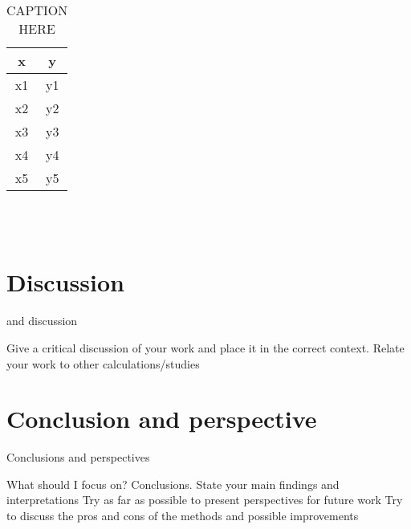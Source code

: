 \documentclass{article}
\begin{document}
    \begin{table}[H]
      \centering
      \caption{CAPTION HERE}
      \vspace{2mm}
      \label{tab:LABELHERE}
      \begin{tabular}{|c|c|}
          \hline
           x & y\\
          \hline \hline
          x1 & y1 \\
          x2 & y2 \\
          x3 & y3 \\
          x4 & y4 \\
          x5 & y5 \\
          \hline
      \end{tabular} \\
      \hspace{0pt}\\
    \end{table}
\fi

\vspace{1cm}

\clearpage
\newpage

\section{Discussion} \label{sec:Discussion}

 and discussion


 Give a critical discussion of your work and place it in the correct context.
 Relate your work to other calculations/studies

\vspace{1cm}

\section{Conclusion and perspective} \label{sec:Conclusion}

Conclusions and perspectives


What should I focus on? Conclusions.
State your main findings and interpretations
Try as far as possible to present perspectives for future work
Try to discuss the pros and cons of the methods and possible improvements


\vspace{1cm}
\end{document}
